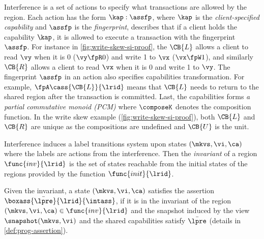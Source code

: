Interference is a set of actions to specify what transactions are allowed by the region.
Each action has the form \( \kap : \assfp \),
where \( \kap \) is the \emph{client-specified capability} and \( \assfp \) is the \emph{fingerprint},
describes that if a client holds the capability \( \kap \), 
it is allowed to execute a transaction with the fingerprint \( \assfp \).
For instance in \cref{fig:write-skew-si-proof}, 
the \( \CB{L}\) allows a client to read \( \vy \) when it is 0 (\(\vy \fpR 0\)) and write 1 to \( \vx \) (\(\vx \fpW 1\)),
and similarly \( \CB{R} \) allows a client to read \( \vx \) when it is 0 and write 1 to \( \vy \).
The fingerprint \( \assfp \) in an action also specifies capabilities transformation.
For example, \( \null \fpA \cass{\CB{L}}{\lrid} \) means that \( \CB{L} \) needs to return to the shared region after the transaction is committed.
Last, the capabilities forms \emph{a partial commutative monoid (PCM)} where \( \composeK \) denotes the composition function.
In the write skew example (\cref{fig:write-skew-si-proof}), 
both \( \CB{L} \) and \( \CB{R} \) are unique as the compositions are undefined and \( \CB{U} \) is the unit.

Interference induces a label transitions system upon states \( (\mkvs, \vi, \ca) \)
where the labels are actions from the interference.
Then the \emph{invariant} of a region \( \func{inv}{\lrid} \) is the set of states reachable from 
the initial states of the regions provided by the function \( \func{init}{\lrid}\).

Given the invariant, a state \( (\mkvs, \vi, \ca) \) satisfies the assertion \( \boxass{\bar{\lpre}}{\lrid}{\intass} \),
if it is in the invariant of the region \( (\mkvs, \vi, \ca) \in \func{inv}{\lrid} \) and the snapshot induced by the view \( \snapshot(\mkvs, \vi) \) and 
the shared capabilities satisfy \( \bar{\lpre} \) (details in \cref{def:prog-assertion}).

